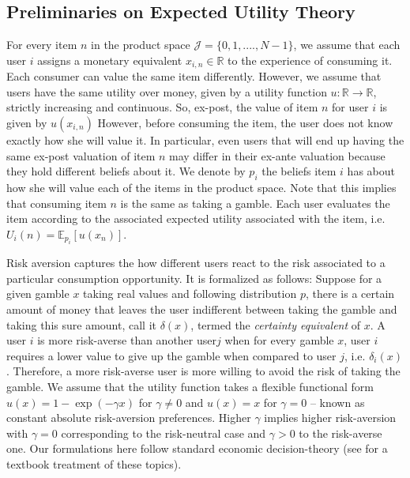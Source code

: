 \documentclass[format=acmsmall, review=false]{acmart}
\begin{document}
\subsection{Preliminaries on Expected Utility Theory}
\noindent For every item $n$ in the product space $\mathcal J=\{0,1,....,N-1\}$, we assume that each user $i$ assigns a monetary equivalent $x_{i,n} \in \mathbb R$ to the experience of consuming it. Each consumer can value the same item differently. However, we assume that users have the same utility over money, given by a utility function $u: \mathbb R \to \mathbb R$, strictly increasing and continuous. So, ex-post, the value of item $n$ for user $i$ is given by $u(x_{i,n})$ However, before consuming the item, the user does not know exactly how she will value it. In particular, even users that will end up having the same ex-post valuation of item $n$ may differ in their ex-ante valuation because they hold different beliefs about it. We denote by $p_{i}$ the beliefs item $i$ has about how she will value each of the items in the product space. Note that this implies that consuming item $n$ is the same as taking a gamble. Each user evaluates the item according to the associated expected utility associated with the item, i.e. $U_i(n)=\mathbb E_{p_i}[u(x_n)]$. 
\par

Risk aversion captures the how different users react to the risk associated to a particular consumption opportunity. It is formalized as follows: Suppose for a given gamble $x$ taking real values and following distribution $p$, there is a certain amount of money that leaves the user indifferent between taking the gamble and taking this sure amount, call it $\delta(x)$, termed the \textit{certainty equivalent} of $x$. A user $i$ is more risk-averse than another user$j$ when for every gamble $x$, user $i$ requires a lower value to give up the gamble when compared to user $j$, i.e. $\delta_i(x)$. Therefore, a more risk-averse user is more willing to avoid the risk of taking the gamble. We assume that the utility function takes a flexible functional form $u(x)=1-\exp(-\gamma x)$ for $\gamma\ne0$ and $u(x)=x$ for $\gamma=0$ -- known as constant absolute risk-aversion preferences. Higher $\gamma$ implies higher risk-aversion with $\gamma=0$ corresponding to the risk-neutral case and $\gamma>0$ to the risk-averse one. Our formulations here follow standard economic decision-theory (see \cite{mas1995microeconomic} for a textbook treatment of these topics).
\par
\end{document}

